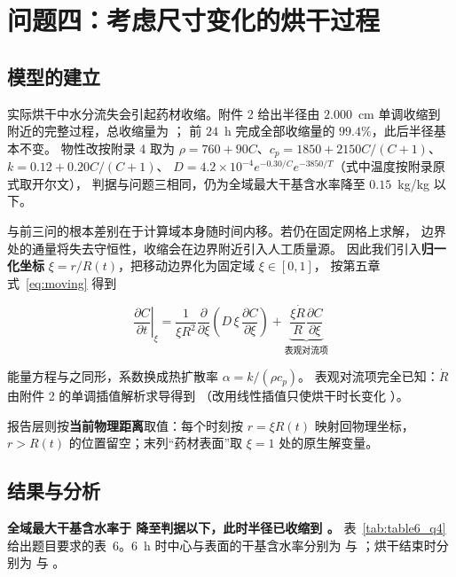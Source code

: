 \section{问题四：考虑尺寸变化的烘干过程}

\subsection{模型的建立}


实际烘干中水分流失会引起药材收缩。附件 2 给出半径由 $2.000$~cm 单调收缩到
\qfourRatdryingendcm 附近的完整过程，总收缩量为 \qfourshrinkagepercent；
前 $24$~h 完成全部收缩量的 $99.4\%$，此后半径基本不变。
物性改按附录 4 取为 $\rho=760+90C$、$c_p=1850+2150C/(C+1)$、$k=0.12+0.20C/(C+1)$、
$D=4.2\times10^{-4}e^{-0.30/C}e^{-3850/T}$（式中温度按附录原式取开尔文），
判据与问题三相同，仍为全域最大干基含水率降至 $0.15$~kg/kg 以下。


与前三问的根本差别在于计算域本身随时间内移。若仍在固定网格上求解，
边界处的通量将失去守恒性，收缩会在边界附近引入人工质量源。
因此我们引入\textbf{归一化坐标} $\xi=r/R(t)$，把移动边界化为固定域 $\xi\in[0,1]$，
按第五章式~\eqref{eq:moving} 得到

\begin{equation}
\left.\frac{\partial C}{\partial t}\right|_{\xi}
=\frac{1}{\xi R^{2}}\frac{\partial}{\partial \xi}
\left(D\,\xi\,\frac{\partial C}{\partial \xi}\right)
+\underbrace{\frac{\xi\dot R}{R}\frac{\partial C}{\partial \xi}}_{\text{表观对流项}}
\label{eq:q4moving}
\end{equation}

能量方程与之同形，系数换成热扩散率 $\alpha=k/(\rho c_p)$。
表观对流项完全已知：$\dot R$ 由附件 2 的单调插值解析求导得到
（改用线性插值只使烘干时长变化 \qfourradiusinterphours）。

报告层则按\textbf{当前物理距离}取值：每个时刻按 $r=\xi R(t)$ 映射回物理坐标，
$r>R(t)$ 的位置留空；末列“药材表面”取 $\xi=1$ 处的原生解变量。

\subsection{结果与分析}


\textbf{全域最大干基含水率于 \qfourdryingtimehours 降至判据以下，此时半径已收缩到 \qfourRatdryingendcm。}
表~\ref{tab:table6_q4} 给出题目要求的表~6。$6$~h 时中心与表面的干基含水率分别为
\qfourtablesixtsixcenter 与 \qfourtablesixtsixsurface；烘干结束时分别为 \qfourtablesixendcenter
与 \qfourtablesixendsurface。

